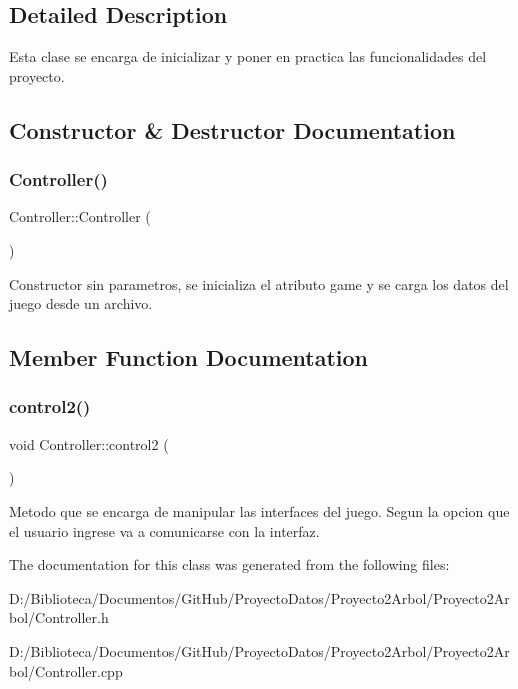 \subsection{Detailed Description}
Esta clase se encarga de inicializar y poner en practica las funcionalidades del proyecto. 

\subsection{Constructor \& Destructor Documentation}
\mbox{\label{class_controller_a95c56822d667e94b031451729ce069a9}} 
\subsubsection{\texorpdfstring{Controller()}{Controller()}}
{\footnotesize\ttfamily Controller\+::\+Controller (\begin{DoxyParamCaption}{ }\end{DoxyParamCaption})}

Constructor sin parametros, se inicializa el atributo game y se carga los datos del juego desde un archivo. 

\subsection{Member Function Documentation}
\mbox{\label{class_controller_a179fd6c4df220688036776f10dd5373c}} 
\subsubsection{\texorpdfstring{control2()}{control2()}}
{\footnotesize\ttfamily void Controller\+::control2 (\begin{DoxyParamCaption}{ }\end{DoxyParamCaption})}

Metodo que se encarga de manipular las interfaces del juego. Segun la opcion que el usuario ingrese va a comunicarse con la interfaz. 

The documentation for this class was generated from the following files\+:\begin{DoxyCompactItemize}
\item 
D\+:/\+Biblioteca/\+Documentos/\+Git\+Hub/\+Proyecto\+Datos/\+Proyecto2\+Arbol/\+Proyecto2\+Arbol/Controller.\+h\item 
D\+:/\+Biblioteca/\+Documentos/\+Git\+Hub/\+Proyecto\+Datos/\+Proyecto2\+Arbol/\+Proyecto2\+Arbol/Controller.\+cpp\end{DoxyCompactItemize}
